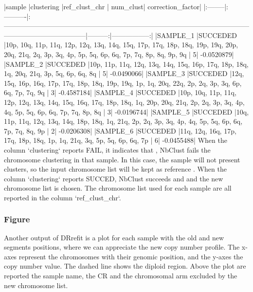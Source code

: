 \documentclass{article}
\begin{document}
\begin{Schunk}
\end{Schunk}
|sample   |clustering |ref_clust_chr                                                                                                                                    | num_clust| correction_factor|
|:--------|:----------|:------------------------------------------------------------------------------------------------------------------------------------------------|---------:|-----------------:|
|SAMPLE_1 |SUCCEDED   |10p, 10q, 11p, 11q, 12p, 12q, 13q, 14q, 15q, 17p, 17q, 18p, 18q, 19p, 19q, 20p, 20q, 21q, 2q, 3p, 3q, 4p, 5p, 5q, 6p, 6q, 7p, 7q, 8p, 8q, 9p, 9q |         5|        -0.0520879|
|SAMPLE_2 |SUCCEDED   |10p, 11p, 11q, 12q, 13q, 14q, 15q, 16p, 17q, 18p, 18q, 1q, 20q, 21q, 3p, 5q, 6p, 6q, 8q                                                          |         5|        -0.0490066|
|SAMPLE_3 |SUCCEDED   |12q, 15q, 16p, 16q, 17p, 17q, 18p, 18q, 19p, 19q, 1p, 1q, 20q, 22q, 2p, 2q, 3p, 3q, 6p, 6q, 7p, 7q, 9q                                           |         3|        -0.4587184|
|SAMPLE_4 |SUCCEDED   |10p, 10q, 11p, 11q, 12p, 12q, 13q, 14q, 15q, 16q, 17q, 18p, 18q, 1q, 20p, 20q, 21q, 2p, 2q, 3p, 3q, 4p, 4q, 5p, 5q, 6p, 6q, 7p, 7q, 8p, 8q       |         3|        -0.0196744|
|SAMPLE_5 |SUCCEDED   |10q, 11p, 11q, 12q, 13q, 14q, 18p, 18q, 1q, 21q, 2p, 2q, 3p, 3q, 4p, 4q, 5p, 5q, 6p, 6q, 7p, 7q, 8q, 9p                                          |         2|        -0.0206308|
|SAMPLE_6 |SUCCEDED   |11q, 12q, 16q, 17p, 17q, 18p, 18q, 1p, 1q, 21q, 3q, 5p, 5q, 6p, 6q, 7p                                                                           |         6|        -0.0455488|
When the column `clustering` reports FAIL, it indicates that , NbClust fails the chromosome clustering in that sample. In this case, the sample will not present clusters, so the input chromosome list will be kept as reference . When the column `clustering` reports SUCCED, NbClust succeeds and and the new chromosome list is chosen. The chromosome list used for each sample are all reported in the column `ref_clust_chr`.

\subsubsection*{Figure}
Another output of DRrefit is a plot for each sample with the old and new segments positions, where we can appreciate the new copy number profile. The x-axes represent the chromosomes with their genomic position, and the y-axes the copy number value. The dashed line shows the diploid region. Above the plot are reported the sample name, the CR and the chromosomal arm excluded by the new chromosome list.
\end{document}
